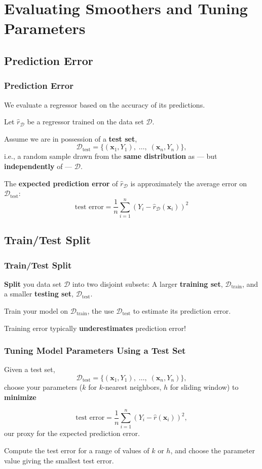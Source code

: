 \documentclass[xcolor={dvipsnames}]{beamer}
\renewcommand{\hat}{\widehat}
\newcommand{\cD}{\mathcal{D}}
\newcommand{\vx}{\mathbf{x}}
\newcommand{\train}{{\text{train}}}
\newcommand{\test}{{\text{test}}}
\begin{document}
\section{Evaluating Smoothers and Tuning Parameters}

\subsection{Prediction Error}
\begin{frame}
    \frametitle{Prediction Error}
    \setlength\parskip{0.75em}

    We evaluate a regressor based on the accuracy of its predictions.

    Let $\hat r_\cD$ be a regressor trained on the data set $\cD$.

    Assume we are in possession of a \textbf{test set},
    $$\cD_\test=\{(\vx_1,Y_1),\;\ldots,\;(\vx_n, Y_n)\},$$
    i.e., a random sample drawn from the \textbf{same distribution} as --- but \textbf{independently} of --- $\cD$.

    The \textbf{expected prediction error} of $\hat r_\cD$ is approximately the average error on $\cD_\test$:
    \[
        \text{test error} = \frac1n\sum_{i=1}^n (Y_i - \hat r_\cD(\vx_i))^2
    \]
\end{frame}

\subsection{Train/Test Split}
\begin{frame}
    \frametitle{Train/Test Split}
    \setlength\parskip{1em}

    \textbf{Split} you data set $\cD$ into two disjoint subsets: A larger \textbf{training set}, $\cD_\train$, and a smaller \textbf{testing set}, $\cD_\test$.

    Train your model on $\cD_\train$, the use $\cD_\test$ to estimate its prediction error.

    Training error typically \textbf{underestimates} prediction error!
\end{frame}


\begin{frame}
    \frametitle{Tuning Model Parameters Using a Test Set}
    \setlength\parskip{1em}

    Given a test set, $$\cD_\test = \{(\vx_1,Y_1),\;\ldots,\;(\vx_n, Y_n)\},$$
    choose your parameters
    ($k$ for $k$-nearest neighbors, $h$ for sliding window)
    to \textbf{minimize}
    
    \[
        \text{test error} = \frac1n\sum_{i=1}^n (Y_i - \hat r(\vx_i))^2,
    \]
    our proxy for the expected prediction error.

    Compute the test error for a range of values of $k$ or $h$,
    and choose the parameter value giving the smallest test error.
\end{frame}
\end{document}
